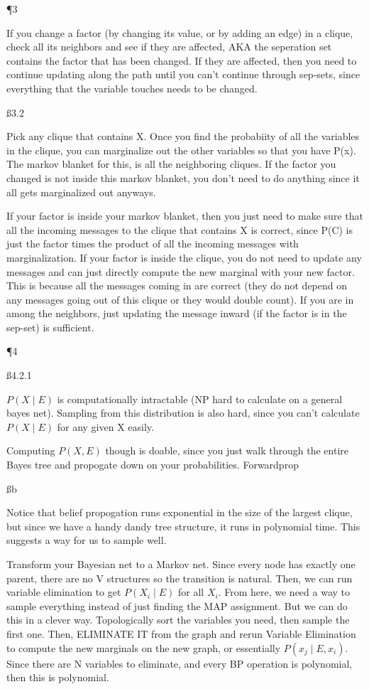 \P 3

If you change a factor (by changing its value, or by adding an edge) in a clique, check all its neighbors and see if they are affected, AKA the seperation set contains the factor that has been changed. If they are affected, then you need to continue updating along the path until you can't continue through sep-sets, since everything that the variable touches needs to be changed.

\ss{3.2}

Pick any clique that contains X. Once you find the probabiity of all the variables in the clique, you can marginalize out the other variables so that you have P(x). The markov blanket for this, is all the neighboring cliques. If the factor you changed is not inside this markov blanket, you don't need to do anything since it all gets marginalized out anyways.

If your factor is inside your markov blanket, then you just need to make sure that all the incoming messages to the clique that contains X is correct, since P(C) is just the factor times the product of all the incoming messages with marginalization. If your factor is inside the clique, you do not need to update any messages and can just directly compute the new marginal with your new factor. This is because all the messages coming in are correct (they do not depend on any messages going out of this clique or they would double count). If you are in among the neighbors, just updating the message inward (if the factor is in the sep-set) is sufficient.

\P 4

\ss{4.2.1}

$P(X \mid E)$ is computationally intractable (NP hard to calculate on a general bayes net). Sampling from this distribution is also hard, since you can't calculate $P(X \mid E)$ for any given X easily.

Computing $P(X,E)$ though is doable, since you just walk through the entire Bayes tree and propogate down on your probabilities. Forwardprop

\ss b

Notice that belief propogation runs exponential in the size of the largest clique, but since we have a handy dandy tree structure, it runs in polynomial time. This suggests a way for us to sample well.

Transform your Bayesian net to a Markov net. Since every node has exactly one parent, there are no V structures so the transition is natural. Then, we can run variable elimination to get $P(X_i \mid E)$ for all $X_i$. From here, we need a way to sample everything instead of just finding the MAP assignment. But we can do this in a clever way. Topologically sort the variables you need, then sample the first one. Then, ELIMINATE IT from the graph and rerun Variable Elimination to compute the new marginals on the new graph, or essentially $P(x_j \mid E,x_i)$. Since there are N variables to eliminate, and every BP operation is polynomial, then this is polynomial.

